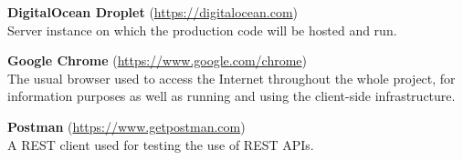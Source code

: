 \begin{addmargin}[1em]{0em}
\textbf{DigitalOcean Droplet} (\url{https://digitalocean.com})\\
Server instance on which the production code will be hosted and run.

\textbf{Google Chrome} (\url{https://www.google.com/chrome})\\
The usual browser used to access the Internet throughout the whole project, for information purposes as well as running and using the client-side infrastructure.

\textbf{Postman} (\url{https://www.getpostman.com})\\
A REST client used for testing the use of REST APIs.
\end{addmargin}
